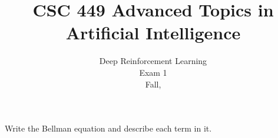 \documentclass[12pt]{exam}
\title{CSC 449 Advanced Topics in Artificial Intelligence}
\date{Deep Reinforcement Learning\\Exam 1\\Fall, \the\year}
\newif\ifanswers
\begin{document}
\maketitle



\newlength{\mytabcolsep}
\setlength{\mytabcolsep}{0.75pt}
\newlength{\zerowidth}
\settowidth{\zerowidth}{0}
\newlength{\normaltabcolsep}
\setlength{\normaltabcolsep}{\tabcolsep}

 \begin{question}{30} 
   Write the Bellman equation and describe each term in it.

       \begin{minipage}[t][5in]{\linewidth}
         \ifanswers
         Put answer here
         \fi
       \end{minipage}

   \end{question}

 
\end{document}
